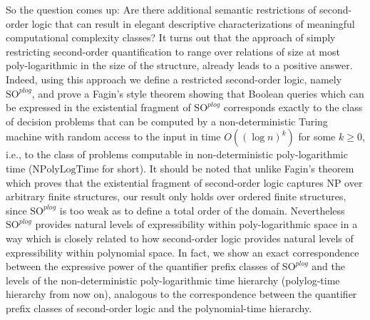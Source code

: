 \documentclass{article}
\newcommand{\npolylog}{\mathrm{NPolyLogTime}}
\begin{document}
So the question comes up: Are there additional semantic restrictions of second-order logic that can result in elegant descriptive characterizations of meaningful computational complexity classes? It turns out that the approach of simply restricting second-order quantification to range over relations of size at most poly-logarithmic in the size of the structure, already leads to a positive answer. Indeed, using this approach we define a restricted second-order logic, namely $\mathrm{SO}^{\mathit{plog}}$, and prove a Fagin's style theorem showing that Boolean queries which can be expressed in the existential fragment of $\mathrm{SO}^{\mathit{plog}}$ corresponds exactly to the class of decision problems that can be computed by a non-deterministic Turing machine with random access to the input in time $O((\log n)^k)$ for some $k \ge 0$, i.e., to the class of problems computable in non-deterministic poly-logarithmic time ($\npolylog$ for short). It should be noted that unlike Fagin's theorem which proves that the existential fragment of second-order logic captures NP over arbitrary finite structures, our result only holds over ordered finite structures, since $\mathrm{SO}^{\mathit{plog}}$ is too weak as to define a total order of the domain. Nevertheless $\mathrm{SO}^{\mathit{plog}}$ provides natural levels of expressibility within poly-logarithmic space in a way which is closely related to how second-order logic provides natural levels of expressibility within polynomial space. In fact, we show an exact correspondence between the expressive power of the quantifier prefix classes of $\mathrm{SO}^{\mathit{plog}}$ and the levels of the non-deterministic poly-logarithmic time hierarchy (polylog-time hierarchy from now on), analogous to the correspondence between the quantifier prefix classes of second-order logic and the polynomial-time hierarchy.
\end{document}

